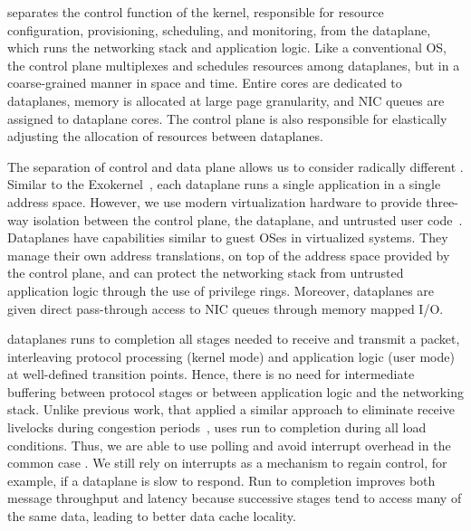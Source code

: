  \ix
separates the control function of the kernel, responsible for resource
configuration, provisioning, scheduling, and monitoring, from the
dataplane, which runs the networking stack and application logic.
Like a conventional OS, the control plane multiplexes and schedules
resources among dataplanes, but in a coarse-grained manner in space
and time. Entire cores are dedicated to dataplanes, memory is
allocated at large page granularity, and NIC queues are assigned to
dataplane cores. The control plane is also responsible for elastically
adjusting the allocation of resources between dataplanes.

The separation of control and data plane allows us to consider
radically different .  
Similar to the Exokernel~\cite{DBLP:conf/sosp/EnglerKO95}, each
dataplane runs a single application in a single address
space. However, we use modern virtualization hardware to provide
three-way isolation between the control plane, the dataplane, and
untrusted user code~\cite{dune}. Dataplanes have capabilities similar
to guest OSes in virtualized systems. They manage their own address
translations, on top of the address space provided by the control
plane, and can protect the networking stack from untrusted application
logic through the use of privilege rings. Moreover, dataplanes are
given direct pass-through access to NIC queues through memory mapped
I/O.



 \ix dataplanes
runs to completion all stages needed to receive and transmit a packet,
interleaving protocol processing (kernel mode) and application logic
(user mode) at well-defined transition points. Hence, there is no need
for intermediate buffering between protocol stages or between
application logic and the networking stack.  Unlike previous work, that
applied a similar approach to eliminate receive livelocks during
congestion periods~\cite{receive-livelock}, \ix uses run to completion
during all load conditions. Thus, we are able to use polling and avoid
interrupt overhead in the common case . We still rely on interrupts as
a mechanism to regain control, for example, if a dataplane is slow to
respond.  Run to completion improves both message throughput and
latency because successive stages tend to access many of the same
data, leading to better data cache locality.

